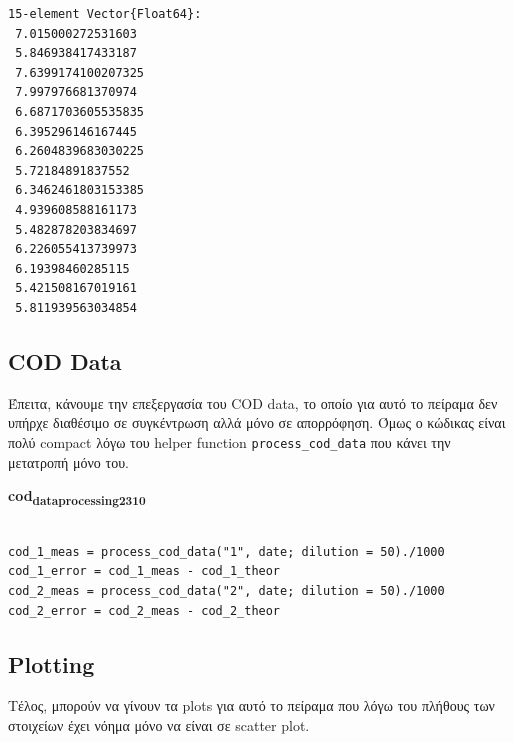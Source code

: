 \documentclass[11pt]{article}
\begin{document}
\begin{verbatim}
15-element Vector{Float64}:
 7.015000272531603
 5.846938417433187
 7.6399174100207325
 7.997976681370974
 6.6871703605535835
 6.395296146167445
 6.2604839683030225
 5.72184891837552
 6.3462461803153385
 4.939608588161173
 5.482878203834697
 6.226055413739973
 6.19398460285115
 5.421508167019161
 5.811939563034854
\end{verbatim}

\subsection{COD Data}
\label{sec:org95bc10d}
Έπειτα, κάνουμε την επεξεργασία του COD data, το οποίο για αυτό το πείραμα δεν υπήρχε διαθέσιμο σε συγκέντρωση αλλά μόνο σε απορρόφηση. Όμως ο κώδικας είναι πολύ compact λόγω του helper function \texttt{process\_cod\_data} που κάνει την μετατροπή μόνο του.

\textbf{cod\textsubscript{data}\textsubscript{processing}\textsubscript{23}\textsubscript{10}}
\begin{verbatim}

cod_1_meas = process_cod_data("1", date; dilution = 50)./1000
cod_1_error = cod_1_meas - cod_1_theor
cod_2_meas = process_cod_data("2", date; dilution = 50)./1000
cod_2_error = cod_2_meas - cod_2_theor

\end{verbatim}

\subsection{Plotting}
\label{sec:org50e6bcd}
Τέλος, μπορούν να γίνουν τα plots για αυτό το πείραμα που λόγω του πλήθους των στοιχείων έχει νόημα μόνο να είναι σε scatter plot.
\end{document}
